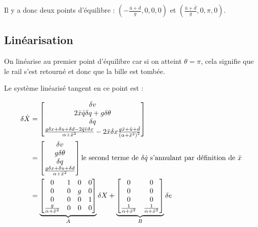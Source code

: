 \documentclass[10pt]{article}
\begin{document}
\vspace{10px}

\noindent Il y a donc deux points d'équilibre : $\left( - \frac{\bar u + \bar d}{g}, 0, 0, 0 \right)$ et $\left( \frac{\bar u + \bar d}{g}, 0, \pi, 0 \right)$.

\subsection*{Linéarisation}

On linéarise au premier point d'équilibre car si on atteint $\theta = \pi$, cela signifie que le rail s'est retourné et donc que la bille est tombée.

\vspace{10px}

\noindent Le système linéarisé tangent en ce point est :

\begin{align}
\delta \dot X &=
	\begin{bmatrix} 
		\delta v \\
		2 \bar x \bar q \delta q + g \delta \theta \\
		\delta q \\
		\frac{g \delta x + \delta u + \delta d - 2 \bar q \bar v \delta x}{\alpha + \bar x^2} - 2 \bar x \delta x \frac{g \bar x + \bar u + \bar d}{\left( \alpha + \bar x^2 \right)^2}
	\end{bmatrix} \notag \\
	&= \begin{bmatrix} 
		\delta v \\
		g \delta \theta \\
		\delta q \\
		\frac{g \delta x + \delta u + \delta d}{\alpha + \bar x^2}
	\end{bmatrix}
	\text{le second terme de $\delta \dot q$ s'annulant par définition de $\bar x$}
	\notag \\
	&= \underbrace{
	\begin{bmatrix}
		0 & 1 & 0 & 0 \\
		0 & 0 & g & 0 \\
		0 & 0 & 0 & 1 \\
		\frac{g}{\alpha + \bar x^2} & 0 & 0 & 0
	\end{bmatrix}
	}_{A}
	\delta X
	+
	\underbrace{
	\begin{bmatrix}
		0 & 0 \\
		0 & 0 \\
		0 & 0 \\
		\frac{1}{\alpha + \bar x^2} & \frac{1}{\alpha + \bar x^2}
	\end{bmatrix}
	}_{B}
	\delta e \notag
\end{align}
\end{document}
